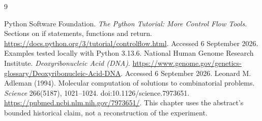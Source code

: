 \begin{thebibliography}{9}
\raggedright
{} Python Software Foundation.
\emph{The Python Tutorial: More Control Flow Tools}. Sections on if statements, functions and return.
\url{https://docs.python.org/3/tutorial/controlflow.html}.
Accessed 6 September 2026. Examples tested locally with Python 3.13.6.
 National Human Genome Research Institute.
\emph{Deoxyribonucleic Acid (DNA)}.
\url{https://www.genome.gov/genetics-glossary/Deoxyribonucleic-Acid-DNA}.
Accessed 6 September 2026.
 Leonard M. Adleman (1994).
Molecular computation of solutions to combinatorial problems.
\emph{Science} 266(5187), 1021--1024.
doi:10.1126/science.7973651.
\url{https://pubmed.ncbi.nlm.nih.gov/7973651/}.
This chapter uses the abstract's bounded historical claim, not a reconstruction of the experiment.
\end{thebibliography}
